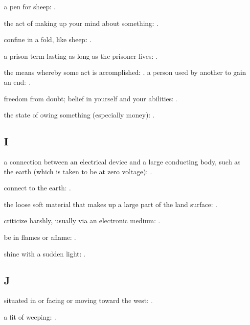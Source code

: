   a pen for sheep:   .

  the act of making up your mind about something:   .

  confine in a fold, like sheep:   .

  a prison term lasting as long as the prisoner lives:   .

  the means whereby some act is accomplished:   . a person used by another to gain an end:   .

  freedom from doubt; belief in yourself and your abilities:   .

  the state of owing something (especially money): .

\subsection*{I}

  a connection between an electrical device and a large conducting body, such as the earth (which is taken to be at zero voltage):   .

  connect to the earth: .

  the loose soft material that makes up a large part of the land surface:   .

  criticize harshly, usually via an electronic medium: .

  be in flames or aflame: .

  shine with a sudden light:   .

\subsection*{J}

  situated in or facing or moving toward the west: .

  a fit of weeping: .

